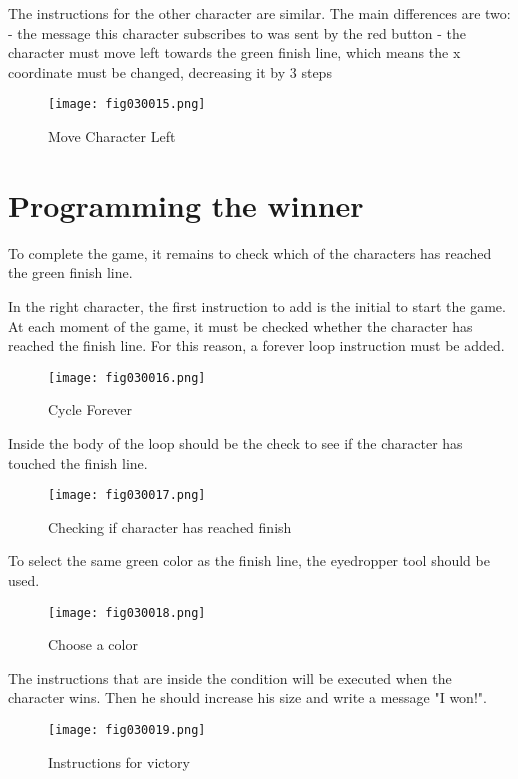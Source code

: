 The instructions for the other character are similar. The main differences are two:
- the message this character subscribes to was sent by the red button
- the character must move left towards the green finish line, which means the x coordinate must be changed, decreasing it by 3 steps

\begin{figure}[H]
   \centering
   \texttt{[image: fig030015.png]}
   \caption{Move Character Left}
\label{fig030015}
\end{figure}

\section{Programming the winner}
To complete the game, it remains to check which of the characters has reached the green finish line.

In the right character, the first instruction to add is the initial to start the game. At each moment of the game, it must be checked whether the character has reached the finish line. For this reason, a forever loop instruction must be added.

\begin{figure}[H]
   \centering
   \texttt{[image: fig030016.png]}
   \caption{Cycle Forever}
\label{fig030016}
\end{figure}

Inside the body of the loop should be the check to see if the character has touched the finish line.

\begin{figure}[H]
   \centering
   \texttt{[image: fig030017.png]}
   \caption{Checking if character has reached finish}
\label{fig030017}
\end{figure}

To select the same green color as the finish line, the eyedropper tool should be used.

\begin{figure}[H]
   \centering
   \texttt{[image: fig030018.png]}
   \caption{Choose a color}
\label{fig030018}
\end{figure}

The instructions that are inside the condition will be executed when the character wins. Then he should increase his size and write a message "I won!".

\begin{figure}[H]
   \centering
   \texttt{[image: fig030019.png]}
   \caption{Instructions for victory}
\label{fig030019}
\end{figure}

